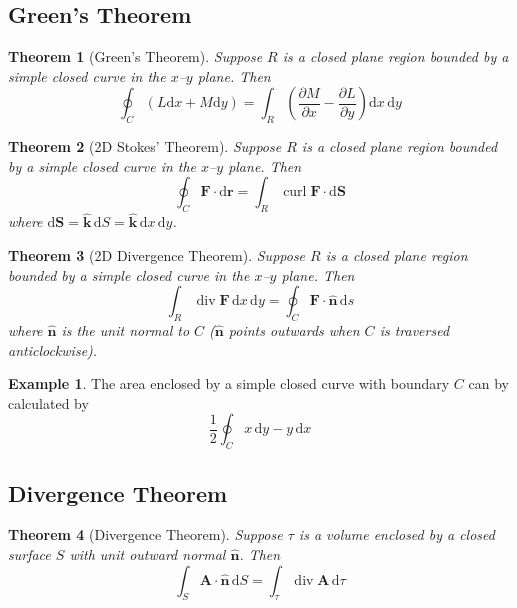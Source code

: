 \documentclass{article}
\newtheorem*{thm}{Theorem}
\theoremstyle{definition}
\newtheorem*{eg}{Example}
\theoremstyle{definition}
\theoremstyle{remark}
\newcommand{\vecA}{\mathbf{A}}
\newcommand{\vecF}{\mathbf{F}}
\newcommand{\bhat}[1]{\mathbf{\hat{#1}}}
\newcommand{\khat}{\bhat{k}}
\newcommand{\nhat}{\bhat{n}}
\DeclareMathOperator{\vdiv}{div}
\DeclareMathOperator{\vcurl}{curl}
\begin{document}
\subsection{Green's Theorem}

\begin{thm}[Green's Theorem]
Suppose $R$ is a closed plane region bounded by a simple closed curve in the $x$--$y$ plane. Then
\begin{equation*}
    \oint_C (L \mathrm{d}x + M \mathrm{d}y) = \int_R \left(\frac{\partial M}{\partial x} - \frac{\partial L}{\partial y}\right) \mathrm{d}x\,\mathrm{d}y
\end{equation*}
\end{thm}

\begin{thm}[2D Stokes' Theorem]
Suppose $R$ is a closed plane region bounded by a simple closed curve in the $x$--$y$ plane. Then
\begin{equation*}
    \oint_C \vecF \cdot \mathrm{d}\mathbf{r} = \int_R \vcurl \vecF \cdot \mathrm{d} \mathbf{S}
\end{equation*}
where $\mathrm{d} \mathbf{S} = \khat \,\mathrm{d}S = \khat \,\mathrm{d}x\,\mathrm{d}y$.
\end{thm}

\begin{thm}[2D Divergence Theorem]
Suppose $R$ is a closed plane region bounded by a simple closed curve in the $x$--$y$ plane. Then
\begin{equation*}
    \int_R \vdiv \vecF \,\mathrm{d}x\,\mathrm{d}y = \oint_C \vecF \cdot \nhat \,\mathrm{d}s
\end{equation*}
where $\nhat$ is the unit normal to $C$ ($\nhat$ points outwards when $C$ is traversed anticlockwise).
\end{thm}

\begin{eg}
The area enclosed by a simple closed curve with boundary $C$ can by calculated by
\begin{equation*}
    \frac{1}{2} \oint_C x \,\mathrm{d}y - y \,\mathrm{d}x
\end{equation*}
\end{eg}

\subsection{Divergence Theorem}

\begin{thm}[Divergence Theorem]
Suppose $\tau$ is a volume enclosed by a closed surface $S$ with unit outward normal $\nhat$. Then
\begin{equation*}
    \int_S \vecA \cdot \nhat \,\mathrm{d}S = \int_\tau \vdiv \vecA \,\mathrm{d}\tau
\end{equation*}
\end{thm}
\end{document}
